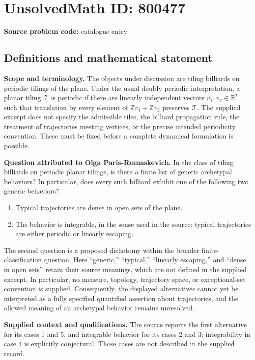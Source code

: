 \documentclass[11pt]{article}
\newcommand{\Z}{\mathbb{Z}}
\newcommand{\R}{\mathbb{R}}
\begin{document}
\section*{UnsolvedMath ID: 800477}
\textbf{Source problem code:} catalogue entry
\subsection{Definitions and mathematical statement}
\textbf{Scope and terminology.} The objects under discussion are tiling billiards on periodic tilings of the plane. Under the usual doubly periodic interpretation, a planar tiling \(\mathcal T\) is periodic if there are linearly independent vectors \(v_1,v_2\in\R^2\) such that translation by every element of \(\Z v_1+\Z v_2\) preserves \(\mathcal T\). The supplied excerpt does not specify the admissible tiles, the billiard propagation rule, the treatment of trajectories meeting vertices, or the precise intended periodicity convention. These must be fixed before a complete dynamical formulation is possible.

\textbf{Question attributed to Olga Paris-Romaskevich.} In the class of tiling billiards on periodic planar tilings, is there a finite list of generic archetypal behaviors? In particular, does every such billiard exhibit one of the following two generic behaviors?
\begin{enumerate}
\item Typical trajectories are dense in open sets of the plane.
\item The behavior is integrable, in the sense used in the source: typical trajectories are either periodic or linearly escaping.
\end{enumerate}
The second question is a proposed dichotomy within the broader finite-classification question. Here ``generic,'' ``typical,'' ``linearly escaping,'' and ``dense in open sets'' retain their source meanings, which are not defined in the supplied excerpt. In particular, no measure, topology, trajectory space, or exceptional-set convention is supplied. Consequently, the displayed alternatives cannot yet be interpreted as a fully specified quantified assertion about trajectories, and the allowed meaning of an archetypal behavior remains unresolved.

\textbf{Supplied context and qualifications.} The source reports the first alternative for its cases 1 and 5, and integrable behavior for its cases 2 and 3; integrability in case 4 is explicitly conjectural. Those cases are not described in the supplied record.
\end{document}
